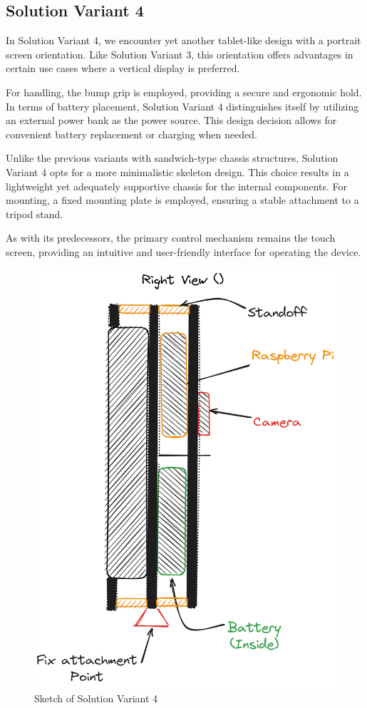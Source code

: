 \subsection{Solution Variant 4}
In Solution Variant 4, we encounter yet another tablet-like design with a portrait screen orientation. Like Solution Variant 3, this orientation offers advantages in certain use cases where a vertical display is preferred.

For handling, the bump grip is employed, providing a secure and ergonomic hold. In terms of battery placement, Solution Variant 4 distinguishes itself by utilizing an external power bank as the power source. This design decision allows for convenient battery replacement or charging when needed.

Unlike the previous variants with sandwich-type chassis structures, Solution Variant 4 opts for a more minimalistic skeleton design. This choice results in a lightweight yet adequately supportive chassis for the internal components. For mounting, a fixed mounting plate is employed, ensuring a stable attachment to a tripod stand.

As with its predecessors, the primary control mechanism remains the touch screen, providing an intuitive and user-friendly interface for operating the device.

\begin{figure}[H]
    \centering
    \includegraphics[scale=0.25]{texs/Part1/chapter3/image/v4.png}
    \caption{Sketch of Solution Variant 4}
    \label{fig:sketch-solution-variant-4}
\end{figure}

